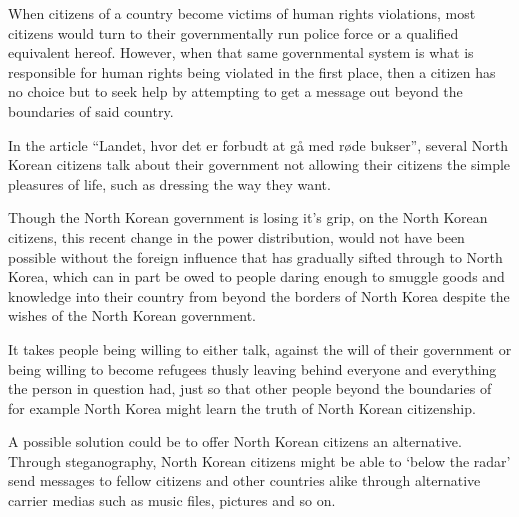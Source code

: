When citizens of a country become victims of human rights violations, most citizens would turn to their governmentally run police force or a qualified equivalent hereof. However, when that same governmental system is what is responsible for human rights being violated in the first place, then a citizen has no choice but to seek help by attempting to get a message out beyond the boundaries of said country.

In the article “Landet, hvor det er forbudt at gå med røde bukser”\cite{rodebukser}, several North Korean citizens talk about their government not allowing their citizens the simple pleasures of life, such as dressing the way they want.

Though the North Korean government is losing it’s grip, on the North Korean citizens, this recent change in the power distribution, would not have been possible without the foreign influence that has gradually sifted through to North Korea, which can in part be owed to people daring enough to smuggle goods and knowledge into their country from beyond the borders of North Korea despite the wishes of the North Korean government.

It takes people being willing to either talk, against the will of their government or being willing to become refugees thusly leaving behind everyone and everything the person in question had, just so that other people beyond the boundaries of for example North Korea might learn the truth of North Korean citizenship.

A possible solution could be to offer North Korean citizens an alternative. Through steganography, North Korean citizens might be able to ‘below the radar’ send messages to fellow citizens and other countries alike through alternative carrier medias such as music files, pictures and so on.